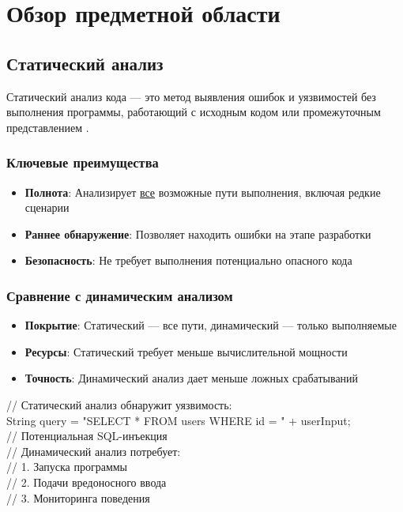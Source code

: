 \section{Обзор предметной области}

\subsection{Статический анализ}
Статический анализ кода — это метод выявления ошибок и уязвимостей без выполнения программы, работающий с исходным кодом или промежуточным представлением \cite{CousotCousot77}.

\subsubsection{Ключевые преимущества}
\begin{itemize}[leftmargin=*]
    \item \textbf{Полнота}: Анализирует \underline{все} возможные пути выполнения, включая редкие сценарии
    \item \textbf{Раннее обнаружение}: Позволяет находить ошибки на этапе разработки
    \item \textbf{Безопасность}: Не требует выполнения потенциально опасного кода
\end{itemize}

\subsubsection{Сравнение с динамическим анализом}
\begin{itemize}[leftmargin=*]
    \item \textbf{Покрытие}: Статический — все пути, динамический — только выполняемые
    \item \textbf{Ресурсы}: Статический требует меньше вычислительной мощности
    \item \textbf{Точность}: Динамический анализ дает меньше ложных срабатываний
\end{itemize}

\begin{codebox}
// Статический анализ обнаружит уязвимость:\\
String query = "SELECT * FROM users WHERE id = " + userInput;\\
// Потенциальная SQL-инъекция\\

// Динамический анализ потребует:\\
// 1. Запуска программы\\
// 2. Подачи вредоносного ввода\\
// 3. Мониторинга поведения\\
\end{codebox}

\newpage

